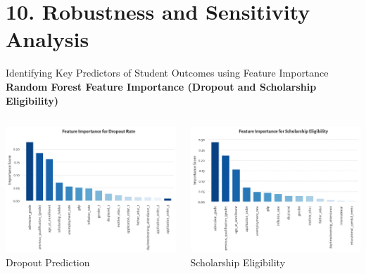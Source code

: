 \documentclass[aspectratio=169]{beamer}
\begin{document}
\section{10. Robustness and Sensitivity Analysis}


\begin{frame}{Identifying Key Predictors of Student Outcomes using Feature Importance}
\textbf{Random Forest Feature Importance (Dropout and Scholarship Eligibility)}
\vspace{8pt}

\begin{columns}
\begin{column}{0.5\textwidth}
\centering
\includegraphics[width=\linewidth]{Tex_Pictures/feature_dropout} \\
\small Dropout Prediction
\end{column}
\begin{column}{0.5\textwidth}
\centering
\includegraphics[width=\linewidth]{Tex_Pictures/feature_scholarship} \\
\small Scholarship Eligibility
\end{column}
\end{columns}
\end{frame}
\end{document}
